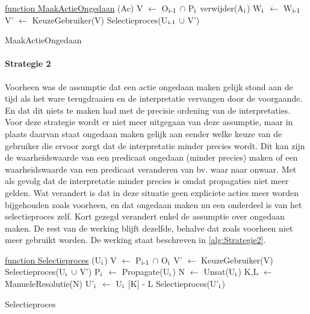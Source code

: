 \begin{algorithm}
	\underline{function MaakActieOngedaan} (Ac)\;
	\Output{}
	V $\leftarrow$ O$\textsubscript{i-1}$ $\cap$ P$\textsubscript{i}$\;
	verwijder(A$\textsubscript{i}$)\;
	W$\textsubscript{i}$ $\leftarrow$ W$\textsubscript{i-1}$\;
		{
		V' $\leftarrow$ KeuzeGebruiker(V)\;
			{
			Selectieproces(U$\textsubscript{i-1}$ $\cup$ V')\;
			}
		}
	\caption{MaakActieOngedaan\label{alg:Strategie1b}}
\end{algorithm}

\paragraph{Strategie 2}
Voorheen was de assumptie dat een actie ongedaan maken gelijk stond aan de tijd als het ware terugdraaien en de interpretatie vervangen door de voorgaande. En dat dit niets te maken had met de precisie ordening van de interpretaties. Voor deze strategie wordt er niet meer uitgegaan van deze assumptie, maar in plaats daarvan staat ongedaan maken gelijk aan eender welke keuze van de gebruiker die ervoor zorgt dat de interpretatie minder precies wordt. Dit kan zijn de waarheidswaarde van een predicaat ongedaan (minder precies) maken of een waarheidswaarde van een predicaat veranderen van bv. waar naar onwaar. Met als gevolg dat de interpretatie minder precies is omdat propagaties niet meer gelden. Wat verandert is dat in deze situatie geen expliciete acties meer worden bijgehouden zoals voorheen, en dat ongedaan maken nu een onderdeel is van het selectieproces zelf. Kort gezegd verandert enkel de assumptie over ongedaan maken. De rest van de werking blijft dezelfde, behalve dat zoals voorheen niet meer gebruikt worden. De werking staat beschreven in \ref{alg:Strategie2}.

\begin{algorithm}
	\underline{function Selectieproces} (U$\textsubscript{i}$)\;
	\Output{}
		{
		V $\leftarrow$ P$\textsubscript{i-1}$ $\cap$ O$\textsubscript{i}$\;
			{
			V' $\leftarrow$ KeuzeGebruiker(V)\; 
			Selectieproces(U$\textsubscript{i}$ $\cup$ V')\;
			}
			{
			P$\textsubscript{i}$ $\leftarrow$ Propagate(U$\textsubscript{i}$)\;	
			}
		}
		{
		N $\leftarrow$ Unsat(U$\textsubscript{i}$)\; 
		K,L $\leftarrow$ ManueleResolutie(N)\;
		U'$\textsubscript{i}$ $\leftarrow$ U$\textsubscript{i}$ 
		[K] - L\; 
		Selectieproces(U'$\textsubscript{i}$)\;
		}
	\caption{Selectieproces\label{alg:Strategie2}}
\end{algorithm}

